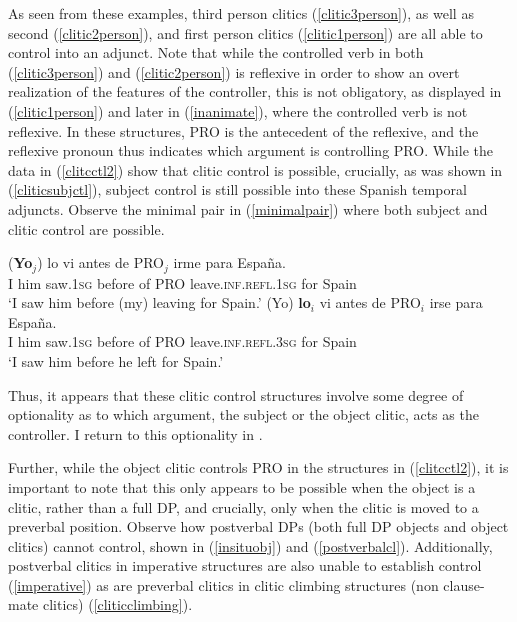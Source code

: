 \documentclass[output=paper,colorlinks,citecolor=brown]{langscibook}
\begin{document}
As seen from these examples, third person clitics (\ref{clitic3person}), as well as second (\ref{clitic2person}), and first person clitics (\ref{clitic1person}) are all able to control into an adjunct. Note that while the controlled verb in both (\ref{clitic3person}) and (\ref{clitic2person}) is reflexive in order to show an overt realization of the features of the controller, this is not obligatory, as displayed in (\ref{clitic1person}) and later in (\ref{inanimate}), where the controlled verb is not reflexive. In these structures, PRO is the antecedent of the reflexive, and the reflexive pronoun thus indicates which argument is controlling PRO. While the data in (\ref{clitcctl2}) show that clitic control is possible, crucially, as was shown in (\ref{cliticsubjctl}), subject control is still possible into these Spanish temporal adjuncts. Observe the minimal pair in (\ref{minimalpair}) where both subject and clitic control are possible.


\ea \label{minimalpair}
\ea \label{minimalpairS}
{
\gll (\textbf{Yo$_j$}) lo vi antes de PRO$_j$ irme para España. \\
I him saw.\textsc{1sg} before of PRO leave.\textsc{inf.refl.1sg} for Spain\\
\glt ‘I saw him before (my) leaving for Spain.’
}
\ex \label{minimalpairC}
{
\gll (Yo) \textbf{lo$_i$} vi antes de PRO$_i$ irse para España. \\
I him saw.\textsc{1sg} before of PRO leave.\textsc{inf.refl.3sg} for Spain\\
\glt ‘I saw him before he left for Spain.’
}
\z
\z

Thus, it appears that these clitic control structures involve some degree of optionality as to which argument, the subject or the object clitic, acts as the controller. I return to this optionality in .


Further, while the object clitic controls PRO in the structures in (\ref{clitcctl2}), it is important to note that this only appears to be possible when the object is a clitic, rather than a full DP, and crucially, only when the clitic is moved to a preverbal position. Observe how postverbal DPs (both full DP objects and object clitics) cannot control, shown in (\ref{insituobj}) and (\ref{postverbalcl}). Additionally, postverbal clitics in imperative structures are also unable to establish control (\ref{imperative}) as are preverbal clitics in clitic climbing structures (non clause-mate clitics) (\ref{cliticclimbing}).
\end{document}

